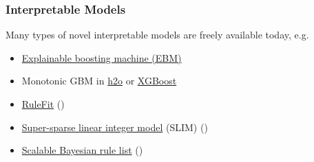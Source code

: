\documentclass[11pt,
               aspectratio=169,
               hyperref={colorlinks}
               ]{beamer}
\begin{document}
	\begin{frame}
	
		\frametitle{Interpretable Models}
		
		Many types of novel interpretable models are freely available today, e.g. 
		
		\begin{itemize}
			\item \href{https://github.com/microsoft/interpret}{Explainable boosting machine (EBM)}
			\item Monotonic GBM in \href{https://github.com/h2oai/h2o-3}{h2o} or \href{https://github.com/dmlc/xgboost}{XGBoost}
			\item \href{https://cran.r-project.org/web/packages/pre/index.html}{RuleFit} (\citet{rulefit})
			\item \href{https://github.com/ustunb/slim-python}{Super-sparse linear integer model} (SLIM)	(\citet{slim})
			\item \href{https://cran.r-project.org/web/packages/sbrl/index.html}{Scalable Bayesian rule list} (\citet{sbrl})

		
		\end{itemize}	
	
	\end{frame}	

\end{document}
